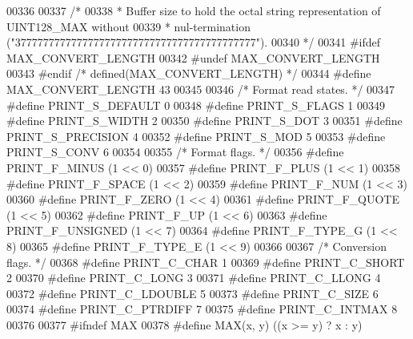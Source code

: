 \begin{DoxyCode}
{00336 
00337 \textcolor{comment}{/*}
00338 \textcolor{comment}{ * Buffer size to hold the octal string representation of UINT128\_MAX without}
00339 \textcolor{comment}{ * nul-termination ("3777777777777777777777777777777777777777777").}
00340 \textcolor{comment}{ */}
00341 \textcolor{preprocessor}{#ifdef MAX\_CONVERT\_LENGTH}
00342 \textcolor{preprocessor}{#undef MAX\_CONVERT\_LENGTH}
00343 \textcolor{preprocessor}{#endif  }\textcolor{comment}{/* defined(MAX\_CONVERT\_LENGTH) */}\textcolor{preprocessor}{}
00344 \textcolor{preprocessor}{#define MAX\_CONVERT\_LENGTH      43}
00345 
00346 \textcolor{comment}{/* Format read states. */}
00347 \textcolor{preprocessor}{#define PRINT\_S\_DEFAULT         0}
00348 \textcolor{preprocessor}{#define PRINT\_S\_FLAGS           1}
00349 \textcolor{preprocessor}{#define PRINT\_S\_WIDTH           2}
00350 \textcolor{preprocessor}{#define PRINT\_S\_DOT             3}
00351 \textcolor{preprocessor}{#define PRINT\_S\_PRECISION       4}
00352 \textcolor{preprocessor}{#define PRINT\_S\_MOD             5}
00353 \textcolor{preprocessor}{#define PRINT\_S\_CONV            6}
00354 
00355 \textcolor{comment}{/* Format flags. */}
00356 \textcolor{preprocessor}{#define PRINT\_F\_MINUS           (1 << 0)}
00357 \textcolor{preprocessor}{#define PRINT\_F\_PLUS            (1 << 1)}
00358 \textcolor{preprocessor}{#define PRINT\_F\_SPACE           (1 << 2)}
00359 \textcolor{preprocessor}{#define PRINT\_F\_NUM             (1 << 3)}
00360 \textcolor{preprocessor}{#define PRINT\_F\_ZERO            (1 << 4)}
00361 \textcolor{preprocessor}{#define PRINT\_F\_QUOTE           (1 << 5)}
00362 \textcolor{preprocessor}{#define PRINT\_F\_UP              (1 << 6)}
00363 \textcolor{preprocessor}{#define PRINT\_F\_UNSIGNED        (1 << 7)}
00364 \textcolor{preprocessor}{#define PRINT\_F\_TYPE\_G          (1 << 8)}
00365 \textcolor{preprocessor}{#define PRINT\_F\_TYPE\_E          (1 << 9)}
00366 
00367 \textcolor{comment}{/* Conversion flags. */}
00368 \textcolor{preprocessor}{#define PRINT\_C\_CHAR            1}
00369 \textcolor{preprocessor}{#define PRINT\_C\_SHORT           2}
00370 \textcolor{preprocessor}{#define PRINT\_C\_LONG            3}
00371 \textcolor{preprocessor}{#define PRINT\_C\_LLONG           4}
00372 \textcolor{preprocessor}{#define PRINT\_C\_LDOUBLE         5}
00373 \textcolor{preprocessor}{#define PRINT\_C\_SIZE            6}
00374 \textcolor{preprocessor}{#define PRINT\_C\_PTRDIFF         7}
00375 \textcolor{preprocessor}{#define PRINT\_C\_INTMAX          8}
00376 
00377 \textcolor{preprocessor}{#ifndef MAX}
00378 \textcolor{preprocessor}{#define MAX(x, y) ((x >= y) ? x : y)}
}
\end{DoxyCode}
